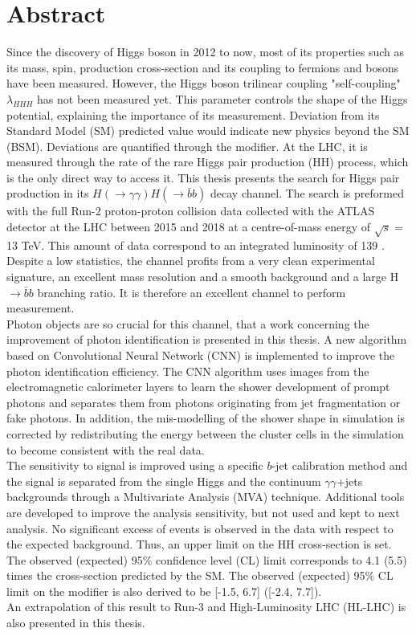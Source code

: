 \newpage
\chapter*{Abstract}
Since the discovery of Higgs boson in 2012 to now, most of its properties such as its mass, spin, production cross-section and its coupling to fermions and bosons have been measured. However, the Higgs boson trilinear coupling "self-coupling" $\lambda_{HHH}$ has not been measured yet. This parameter controls the shape of the Higgs potential, explaining the importance of its measurement. Deviation from its Standard Model (SM) predicted value would indicate new physics beyond the SM (BSM). Deviations are quantified through the \kl modifier. At the LHC, it is measured through the rate of the rare Higgs pair production (HH) process, which is the only direct way to access it. This thesis presents the search for Higgs pair production in its $H(\to\gamma\gamma)H(\to\bar{b}b)$ decay channel. The search is preformed with the full Run-2 proton-proton collision data collected with the ATLAS detector at the LHC between 2015 and 2018 at a centre-of-mass energy of $\sqrt{s} = $ 13 TeV. This amount of data correspond to an integrated luminosity of 139 \ifb. Despite a low statistics, the \bbyy channel profits from a very clean experimental signature, an excellent \myy mass resolution and a smooth background and a large H$\to\bar{b}b$ branching ratio. It is therefore an excellent channel to perform \kl measurement. \\
Photon objects are so crucial for this channel, that a work concerning the improvement of photon identification is presented in this thesis. A new algorithm based on Convolutional Neural Network (CNN) is implemented to improve the photon identification efficiency. The CNN algorithm uses images from the electromagnetic calorimeter layers to learn the shower development of prompt photons and separates them from photons originating from jet fragmentation or fake photons. In addition, the mis-modelling of the shower shape in simulation is corrected by redistributing the energy between the cluster cells in the simulation to become consistent with the real data. \\
The sensitivity to \HHyybb signal is improved using a specific $b$-jet calibration method and the signal is separated from the single Higgs and the continuum $\gamma\gamma$+jets backgrounds through a Multivariate Analysis (MVA) technique. Additional tools are developed to improve the analysis sensitivity, but not used and kept to next analysis. No significant excess of \HHyybb events is observed in the data with respect to the expected background. Thus, an upper limit on the HH cross-section is set. The observed (expected) 95\% confidence level (CL) limit corresponds to 4.1 (5.5) times the cross-section predicted by the SM. The observed (expected) 95\% CL limit on the \kl modifier is also derived to be [-1.5, 6.7] ([-2.4, 7.7]).  \\
An extrapolation of this result to Run-3 and High-Luminosity LHC (HL-LHC) is also presented in this thesis.
 
